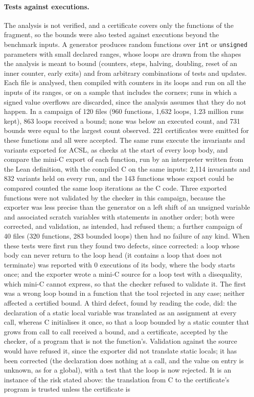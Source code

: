 \documentclass[oneside,english]{amsart}
\numberwithin{equation}{section}
\numberwithin{figure}{section}
\theoremstyle{plain}
\theoremstyle{definition}
\theoremstyle{plain}
\theoremstyle{remark}
\theoremstyle{plain}
\theoremstyle{definition}
\theoremstyle{plain}
\theoremstyle{remark}
\begin{document}
\paragraph{Tests against executions.}
The analysis is not verified, and a certificate covers only the functions of the fragment, so the bounds were also tested against executions beyond the benchmark inputs. A generator produces random functions over \texttt{int} or \texttt{unsigned} parameters with small declared ranges, whose loops are drawn from the shapes the analysis is meant to bound (counters, steps, halving, doubling, reset of an inner counter, early exits) and from arbitrary combinations of tests and updates. Each file is analysed, then compiled with counters in its loops and run on all the inputs of its ranges, or on a sample that includes the corners; runs in which a signed value overflows are discarded, since the analysis assumes that they do not happen. In a campaign of 120 files (960 functions, 1{,}632 loops, 1.23 million runs kept), 863 loops received a bound; none was below an executed count, and 731 bounds were equal to the largest count observed. 221 certificates were emitted for these functions and all were accepted. The same runs execute the invariants and variants exported for ACSL, as checks at the start of every loop body, and compare the mini-C export of each function, run by an interpreter written from the Lean definition, with the compiled C on the same inputs: 2{,}114 invariants and 832 variants held on every run, and the 143 functions whose export could be compared counted the same loop iterations as the C code. Three exported functions were not validated by the checker in this campaign, because the exporter was less precise than the generator on a left shift of an unsigned variable and associated scratch variables with statements in another order; both were corrected, and validation, as intended, had refused them; a further campaign of 40 files (320 functions, 283 bounded loops) then had no failure of any kind. When these tests were first run they found two defects, since corrected: a loop whose body can never return to the loop head (it contains a loop that does not terminate) was reported with $0$ executions of its body, where the body starts once; and the exporter wrote a mini-C source for a loop test with a disequality, which mini-C cannot express, so that the checker refused to validate it. The first was a wrong loop bound in a function that the tool rejected in any case; neither affected a certified bound. A third defect, found by reading the code, did: the declaration of a static local variable was translated as an assignment at every call, whereas C initialises it once, so that a loop bounded by a static counter that grows from call to call received a bound, and a certificate, accepted by the checker, of a program that is not the function's. Validation against the source would have refused it, since the exporter did not translate static locals; it has been corrected (the declaration does nothing at a call, and the value on entry is unknown, as for a global), with a test that the loop is now rejected. It is an instance of the risk stated above: the translation from C to the certificate's program is trusted unless the certificate is 
\end{document}
